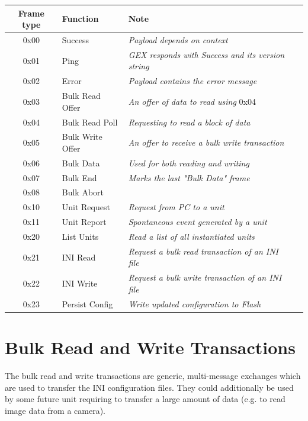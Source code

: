 \begin{table}[h]
	\centering
	\begin{tabular}{clll}
		\toprule
		\textbf{Frame type} & \textbf{Function} & \textbf{Note} \\
		\midrule
		0x00 & Success & \textit{Payload depends on context} \\
		0x01 & Ping & \textit{GEX responds with Success and its version string} \\
		0x02 & Error & \textit{Payload contains the error message} \\
		\midrule
		0x03 & Bulk Read Offer & \textit{An offer of data to read using }0x04 \\
		0x04 & Bulk Read Poll & \textit{Requesting to read a block of data} \\
		0x05 & Bulk Write Offer & \textit{An offer to receive a bulk write transaction} \\
		0x06 & Bulk Data & \textit{Used for both reading and writing} \\
		0x07 & Bulk End & \textit{Marks the last "Bulk Data" frame} \\
		0x08 & Bulk Abort & \textit{} \\		
		\midrule
		0x10 & Unit Request & \textit{Request from PC to a unit} \\
		0x11 & Unit Report & \textit{Spontaneous event generated by a unit} \\		
		\midrule
		0x20 & List Units & \textit{Read a list of all instantiated units} \\
		0x21 & INI Read & \textit{Request a bulk read transaction of an INI file} \\
		0x22 & INI Write & \textit{Request a bulk write transaction of an INI file} \\
		0x23 & Persist Config & \textit{Write updated configuration to Flash} \\
		\bottomrule
	\end{tabular}
\end{table}


\section{Bulk Read and Write Transactions}

The bulk read and write transactions are generic, multi-message exchanges which are used to transfer the INI configuration files. They could additionally be used by some future unit requiring to transfer a large amount of data (e.g. to read image data from a camera).

